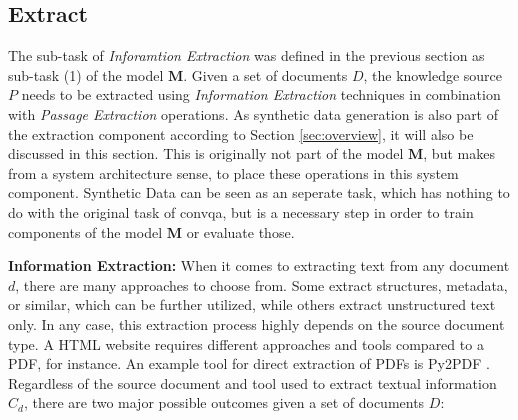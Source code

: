 


\subsection{Extract}
\label{subsec:extract}

The sub-task of \textit{Inforamtion Extraction} was defined in the previous section as sub-task (1) of the model $\mathbf{M}$. Given a set of documents $D$, the knowledge source $P$ needs to be extracted using \textit{Information Extraction} techniques in combination with \textit{Passage Extraction} operations. As synthetic data generation is also part of the extraction component according to Section \ref{sec:overview}, it will also be discussed in this section. This is originally not part of the model $\mathbf{M}$, but makes from a system architecture sense, to place these operations in this system component. Synthetic Data can be seen as an seperate task, which has nothing to do with the original task of \gls{convqa}, but is a necessary step in order to train components of the model $\mathbf{M}$ or evaluate those.

\vspace{\baselineskip} %

\textbf{Information Extraction:} When it comes to extracting text from any document $d$, there are many approaches to choose from. Some extract structures, metadata, or similar, which can be further utilized, while others extract unstructured text only. In any case, this extraction process highly depends on the source document type. A HTML website requires different approaches and tools compared to a PDF, for instance. An example tool for direct extraction of PDFs is Py2PDF \cite{noauthor_welcome_nodate}. Regardless of the source document and tool used to extract textual information $C_d$, there are two major possible outcomes given a set of documents $D$:


